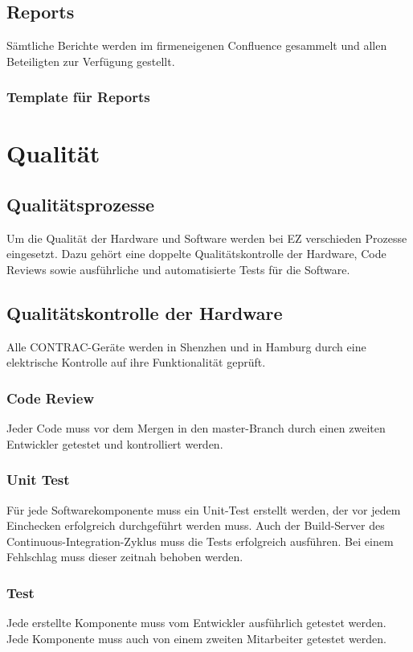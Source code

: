 \subsection{Reports}
Sämtliche Berichte werden im firmeneigenen Confluence gesammelt und allen Beteiligten zur Verfügung gestellt.

\subsubsection{Template für Reports}





\section{Qualität}
\subsection{Qualitätsprozesse}
Um die Qualität der Hardware und Software werden bei EZ verschieden Prozesse eingesetzt. Dazu gehört eine doppelte Qualitätskontrolle der Hardware, Code Reviews sowie ausführliche und automatisierte Tests für die Software.
\subsection{Qualitätskontrolle der Hardware}
Alle CONTRAC-Geräte werden in Shenzhen und in Hamburg durch eine elektrische Kontrolle auf ihre Funktionalität geprüft.
\subsubsection{Code Review}
Jeder Code muss vor dem Mergen in den master-Branch durch einen zweiten Entwickler getestet und kontrolliert werden.
\subsubsection{Unit Test}
Für jede Softwarekomponente muss ein Unit-Test erstellt werden, der vor jedem Einchecken erfolgreich durchgeführt werden muss. Auch der Build-Server des Continuous-Integration-Zyklus muss die Tests erfolgreich ausführen. Bei einem Fehlschlag muss dieser zeitnah behoben werden.
\subsubsection{Test}
Jede erstellte Komponente muss vom Entwickler ausführlich getestet werden. Jede Komponente muss auch von einem zweiten Mitarbeiter getestet werden.
